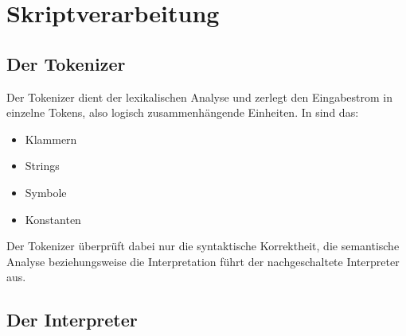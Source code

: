 \section{Skriptverarbeitung}

\subsection{Der Tokenizer}
\label{sec:tokenizer}

Der Tokenizer dient der lexikalischen Analyse und zerlegt den Eingabestrom in einzelne Tokens, also logisch zusammenhängende Einheiten. In \projectname{} sind das:
\begin{itemize}
\item{Klammern}
\item{Strings}
\item{Symbole}
\item{Konstanten}
\end{itemize}
Der Tokenizer überprüft dabei nur die syntaktische Korrektheit, die semantische Analyse beziehungsweise die Interpretation führt der nachgeschaltete Interpreter aus.

\subsection{Der Interpreter}
